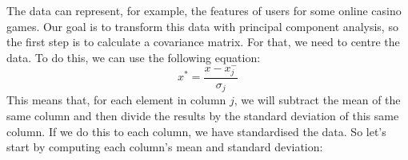 \documentclass[600paper, 11pt,twoside,openany]{kdp}
\begin{document}
\indent The data can represent, for example, the features of users for some online casino games. Our goal is to transform this data with principal component analysis, so the first step is to calculate a covariance matrix. For that, we need to centre the data. To do this, we can use the following equation:
\begin{equation}\label{eq:std}
x^{*} =  \frac{x-x^-_j}{\sigma_j}
\end{equation}
\indent This means that, for each element in column $j$, we will subtract the mean of the same column and then divide the 
results by the standard deviation of this same column. If we do this to each column, we have standardised the data. So let’s start by computing each column’s mean and standard deviation:
\begin{center}
\end{center}
\end{document}
